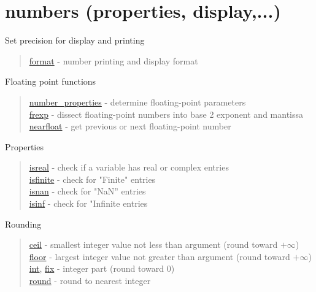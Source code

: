 \chapter*{numbers (properties, display,...)} 

Set precision for display and printing

\begin{quote}
\noindent
\hyperlink{format}{format} - number printing and display format\\
\end{quote}


Floating point functions

\begin{quote}
\noindent
\hyperlink{number_properties}{number\_properties} - determine floating-point parameters \\
\hyperlink{frexp}{frexp} - dissect floating-point numbers into base 2 exponent and mantissa\\
\hyperlink{nearfloat}{nearfloat} - get previous or next floating-point number\\
\end{quote}



Properties

\begin{quote}
\noindent
\hyperlink{isreal}{isreal} - check if a variable has real or complex entries\\
\hyperlink{isfinite}{isfinite} - check for "Finite" entries \\
\hyperlink{isnan}{isnan} - check for "NaN'' entries \\
\hyperlink{isnan}{isinf} - check for "Infinite entries \\
\end{quote}


Rounding

\begin{quote}
\noindent
\hyperlink{ceil}{ceil} - smallest integer value not less than argument (round toward $+\infty$) \\
\hyperlink{floor}{floor} - largest integer value not greater than argument (round toward $+\infty$)\\
\hyperlink{int}{int}, \hyperlink{fix}{fix} - integer part (round toward $0$) \\
\hyperlink{round}{round} - round to nearest integer
\end{quote}


